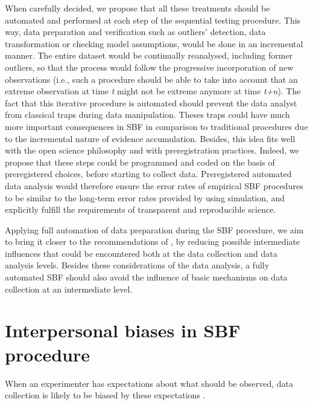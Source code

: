 \documentclass[a4paper,man,natbib,floatsintext,donotrepeattitle]{apa6}
\begin{document}
When carefully decided, we propose that all these treatments should be automated and performed at each step of the sequential testing procedure. This way, data preparation and verification such as outliers' detection, data transformation or checking model assumptions, would be done in an incremental manner. The entire dataset would be continually reanalysed, including former outliers, so that the process would follow the progressive incorporation of new observations (i.e., such a procedure should be able to take into account that an extreme observation at time \textit{t} might not be extreme anymore at time \textit{t+n}). The fact that this iterative procedure is automated should prevent the data analyst from classical traps during data manipulation. Theses traps could have much more important consequences in SBF in comparison to traditional procedures due to the incremental nature of evidence accumulation. Besides, this idea fits well with the open science philosophy and with preregistration practices. Indeed, we propose that these steps could be programmed and coded on the basis of preregistered choices, before starting to collect data. Preregistered automated data analysis would therefore ensure the error rates of empirical SBF procedures to be similar to the long-term error rates provided by \cite{schonbrodt_sequential_2017} using simulation, and explicitly fulfill the requirements of transparent and reproducible science. \par

Applying full automation of data preparation during the SBF procedure, we aim to bring it closer to the recommendations of \cite{schonbrodt_sequential_2017}, by reducing possible intermediate influences that could be encountered both at the data collection and data analysis levels. Besides these considerations of the data analysis, a fully automated SBF should also avoid the influence of basic mechanisms on data collection at an intermediate level.

\section{Interpersonal biases in SBF procedure}

When an experimenter has expectations about what should be observed, data collection is likely to be biased by these expectations \citep{orne_social_1962,rosenthal_social_1963,rosenthal_experimenter_1964,rosenthal_interpersonal_1978,zoble_interaction_1969,klein_low_2012,gilder_role_2018}.
\end{document}
